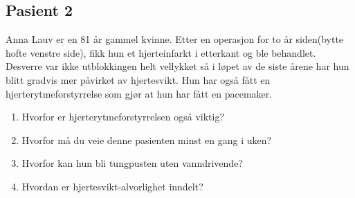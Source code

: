 			\subsection{Pasient 2}
				Anna Lauv er en 81 år gammel kvinne. Etter en operasjon for to år siden(bytte hofte venstre side), fikk hun et hjerteinfarkt i etterkant og ble behandlet. Desverre var ikke utblokkingen helt vellykket så i løpet av de siste årene har hun blitt gradvis mer påvirket av hjertesvikt. Hun har også fått en hjerterytmeforstyrrelse som gjør at hun har fått en pacemaker.
				\begin{enumerate}
					\item Hvorfor er hjerterytmeforstyrrelsen også viktig?
					\item Hvorfor må du veie denne pasienten minst en gang i uken?
					\item Hvorfor kan hun bli tungpusten uten vanndrivende?
					\item Hvordan er hjertesvikt-alvorlighet inndelt?
				\end{enumerate}
\newpage